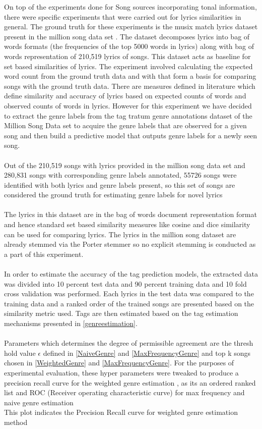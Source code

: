 \noindent On top of the experiments done for Song sources incorporating tonal information, there were specific experiments that were carried out for lyrics similarities in general. The ground truth for these experiments is the musix match lyrics dataset present in the million song data set \cite{msd}. The dataset decomposes lyrics into bag of words formats (the frequencies of the top 5000 words in lyrics) along with bag of words representation of 210,519 lyrics of songs. This dataset acts as baseline for set based similarities of lyrics. The experiment involved calculating the expected word count from the ground truth data and with that form a basis for comparing songs with the ground truth data. There are measures defined in literature \cite{lyricsRanking} which define similarity and accuracy of lyrics based on expected counts of words and observed counts of words in lyrics. However for this experiment we have decided to extract the genre labels from the tag tratum genre annotations dataset of the Million Song Data set \cite{msd} to acquire the genre labels that are observed for a given song and then build a predictive model that outputs genre labels for a newly seen song. \\\\
Out of the 210,519 songs with lyrics provided in the million song data set and 280,831 songs with corresponding genre labels annotated, 55726 songs were identified with both lyrics and genre labels present, so this set of songs are considered the ground truth for estimating genre labels for novel lyrics \\\\ 
The lyrics in this dataset are in the bag of words document representation format and hence standard set based similarity measures like cosine and dice similarity can be used for comparing lyrics. The lyrics in the million song dataset are already stemmed via the Porter stemmer \cite{msd} so no explicit stemming is conducted as a part of this experiment.\\\\
In order to estimate the accuracy of the tag prediction models, the extracted data was divided into 10 percent test data and 90 percent training data and 10 fold cross validation was performed. Each lyrics in the test data was compared to the training data and a ranked order of the trained songs are presented based on the similarity metric used. Tags are then estimated based on the tag estimation mechanisms presented in \ref{genreestimation}. \\\\
Parameters which determines the degree of permissible agreement are the thresh hold value $\epsilon$ defined in \ref{NaiveGenre} and \ref{MaxFrequencyGenre} and top k songs chosen in \ref{WeightedGenre} and \ref{MaxFrequencyGenre}. For the purposes of experimental evaluation, these hyper parameters were tweaked to produce a precision recall curve for the weighted genre estimation , as its an ordered ranked list and ROC (Receiver operating characteristic curve) for max frequency and naive genre estimation \\
\noindent This plot indicates the Precision Recall curve for weighted genre estimation method

